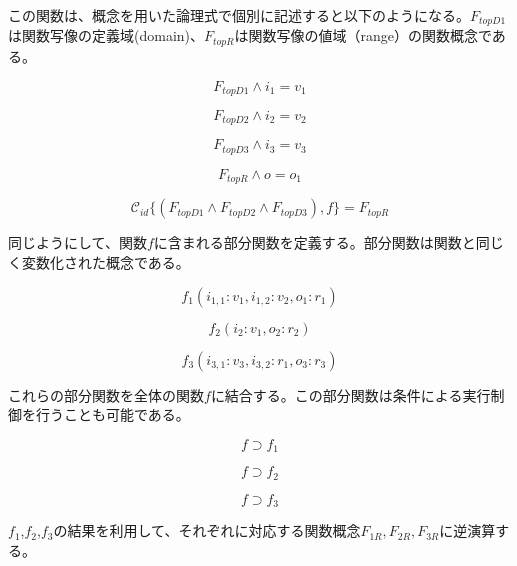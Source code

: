 \documentclass[12pt]{article}
\begin{document}
この関数は、概念を用いた論理式で個別に記述すると以下のようになる。\(F_{topD1}\)は関数写像の定義域(domain)、\(F_{topR}\)は関数写像の値域（range）の関数概念である。

\begin{equation} F_{topD1} \wedge i_1 = v_1 \end{equation}

\begin{equation} F_{topD2} \wedge i_2 = v_2 \end{equation}

\begin{equation} F_{topD3} \wedge i_3 = v_3 \end{equation}

\begin{equation} F_{topR} \wedge o = o_1 \end{equation}

\begin{equation} \mathcal{C}_{id}\{(F_{topD1} \wedge F_{topD2} \wedge F_{topD3}),f \} = F_{topR}\end{equation}

同じようにして、関数\(f\)に含まれる部分関数を定義する。部分関数は関数と同じく変数化された概念である。

\begin{equation} f_1(i_{1,1}:v_1,i_{1,2}:v_2,o_{1}:r_1) \end{equation}

\begin{equation} f_2(i_{2}:v_1,o_{2}:r_2)\end{equation}

\begin{equation} f_3(i_{3,1}:v_3,i_{3,2}:r_1,o_{3}:r_3)\end{equation}

これらの部分関数を全体の関数\(f\)に結合する。この部分関数は条件による実行制御を行うことも可能である。

\begin{equation} f \supset f_1 \end{equation}

\begin{equation} f \supset f_2 \end{equation}

\begin{equation} f \supset f_3 \end{equation}

\(f_1\),\(f_2\),\(f_3\)の結果を利用して、それぞれに対応する関数概念\(F_{1R},F_{2R},F_{3R}\)に逆演算する。
\end{document}
